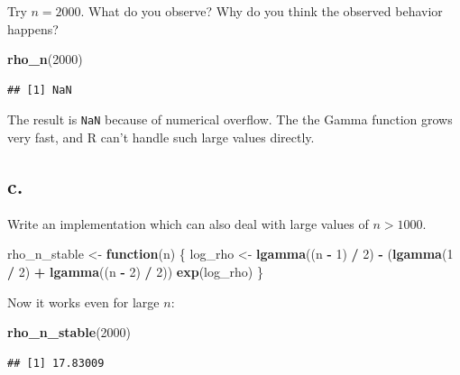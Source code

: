 \documentclass[
]{article}
\newenvironment{Shaded}{\begin{snugshade}}{\end{snugshade}}
\newcommand{\ControlFlowTok}[1]{\textcolor[rgb]{0.13,0.29,0.53}{\textbf{#1}}}
\newcommand{\DecValTok}[1]{\textcolor[rgb]{0.00,0.00,0.81}{#1}}
\newcommand{\FunctionTok}[1]{\textcolor[rgb]{0.13,0.29,0.53}{\textbf{#1}}}
\newcommand{\NormalTok}[1]{#1}
\newcommand{\OtherTok}[1]{\textcolor[rgb]{0.56,0.35,0.01}{#1}}
\newcommand{\SpecialCharTok}[1]{\textcolor[rgb]{0.81,0.36,0.00}{\textbf{#1}}}
\begin{document}
Try \(n = 2000\). What do you observe? Why do you think the observed
behavior happens?

\begin{Shaded}
\begin{Highlighting}[]
\FunctionTok{rho\_n}\NormalTok{(}\DecValTok{2000}\NormalTok{)}
\end{Highlighting}
\end{Shaded}

\begin{verbatim}
## [1] NaN
\end{verbatim}

The result is \texttt{NaN} because of numerical overflow. The the Gamma
function grows very fast, and R can't handle such large values directly.

\subsection{c.}\label{c.-1}

Write an implementation which can also deal with large values of
\(n>1000\).

\begin{Shaded}
\begin{Highlighting}[]
\NormalTok{rho\_n\_stable }\OtherTok{\textless{}{-}} \ControlFlowTok{function}\NormalTok{(n) \{}
\NormalTok{  log\_rho }\OtherTok{\textless{}{-}} \FunctionTok{lgamma}\NormalTok{((n }\SpecialCharTok{{-}} \DecValTok{1}\NormalTok{) }\SpecialCharTok{/} \DecValTok{2}\NormalTok{) }\SpecialCharTok{{-}}\NormalTok{ (}\FunctionTok{lgamma}\NormalTok{(}\DecValTok{1} \SpecialCharTok{/} \DecValTok{2}\NormalTok{) }\SpecialCharTok{+} \FunctionTok{lgamma}\NormalTok{((n }\SpecialCharTok{{-}} \DecValTok{2}\NormalTok{) }\SpecialCharTok{/} \DecValTok{2}\NormalTok{))}
  \FunctionTok{exp}\NormalTok{(log\_rho)}
\NormalTok{\}}
\end{Highlighting}
\end{Shaded}

Now it works even for large \(n\):

\begin{Shaded}
\begin{Highlighting}[]
\FunctionTok{rho\_n\_stable}\NormalTok{(}\DecValTok{2000}\NormalTok{)}
\end{Highlighting}
\end{Shaded}

\begin{verbatim}
## [1] 17.83009
\end{verbatim}
\end{document}
